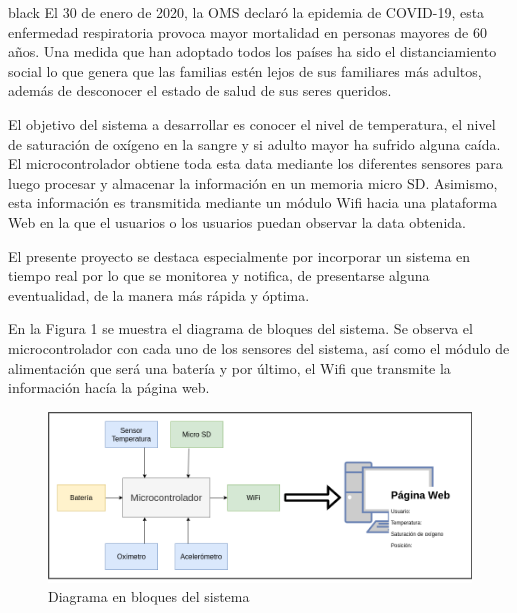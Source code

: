\documentclass[11pt]{charter}
\begin{document}
\begin{consigna}{black}
El 30 de enero de 2020, la OMS declaró la epidemia de COVID-19, esta enfermedad respiratoria provoca mayor mortalidad en personas mayores de 60 años. Una medida que han adoptado todos los países ha sido el distanciamiento social lo que genera que las familias estén lejos de sus familiares más adultos, además de desconocer el estado de salud de sus seres queridos. 

El objetivo del sistema a desarrollar es conocer el nivel de temperatura, el nivel de saturación de oxígeno en la sangre y si adulto mayor ha sufrido alguna caída. El microcontrolador obtiene toda esta data mediante los diferentes sensores para luego procesar y almacenar la información en un memoria micro SD. Asimismo, esta información es transmitida mediante un módulo Wifi hacia una plataforma Web en la que el usuarios o los usuarios puedan observar la data obtenida. 

El presente proyecto se destaca especialmente por incorporar un sistema en tiempo real por lo que se monitorea y notifica, de presentarse alguna eventualidad, de la manera más rápida y óptima. 

En la Figura 1 se muestra el diagrama de bloques del sistema. Se observa el microcontrolador con cada uno de los sensores del sistema, así como  el módulo de alimentación que será una batería y por último, el Wifi que transmite la información hacía la página web.

\vspace{25px}

\begin{figure}[htpb]
\centering 
\includegraphics[width=1\textwidth]{./Figuras/diagBloques.png}
\caption{Diagrama en bloques del sistema}
\label{fig:diagBloques}
\end{figure}

\vspace{25px}

\end{consigna}
\end{document}
